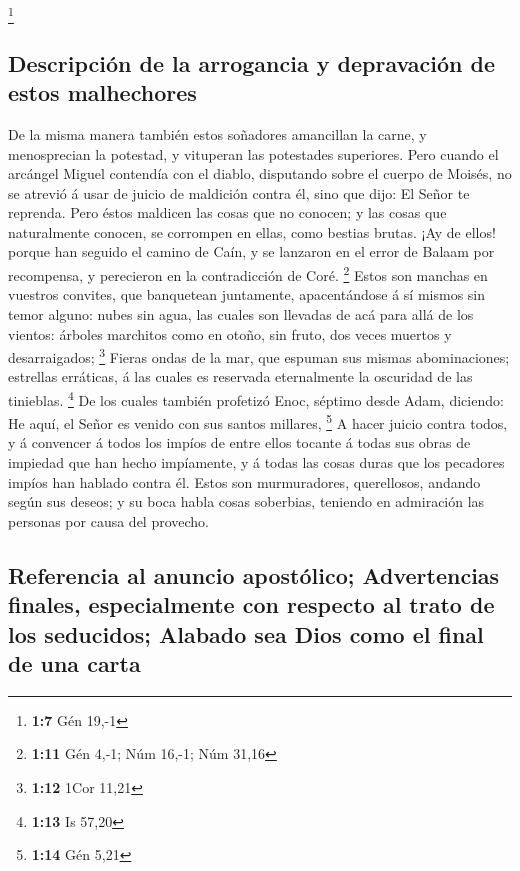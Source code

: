 \footnote{\textbf{1:7} Gén 19,-1}

\hypertarget{descripciuxf3n-de-la-arrogancia-y-depravaciuxf3n-de-estos-malhechores}{%
\subsection{Descripción de la arrogancia y depravación de estos
malhechores}\label{descripciuxf3n-de-la-arrogancia-y-depravaciuxf3n-de-estos-malhechores}}

 De la misma manera también estos soñadores amancillan la
carne, y menosprecian la potestad, y vituperan las potestades
superiores.  Pero cuando el arcángel Miguel contendía con
el diablo, disputando sobre el cuerpo de Moisés, no se atrevió á usar de
juicio de maldición contra él, sino que dijo: El Señor te reprenda.
 Pero éstos maldicen las cosas que no conocen; y las
cosas que naturalmente conocen, se corrompen en ellas, como bestias
brutas.  ¡Ay de ellos! porque han seguido el camino de
Caín, y se lanzaron en el error de Balaam por recompensa, y perecieron
en la contradicción de Coré. \footnote{\textbf{1:11} Gén 4,-1; Núm
  16,-1; Núm 31,16}  Estos son manchas en vuestros
convites, que banquetean juntamente, apacentándose á sí mismos sin temor
alguno: nubes sin agua, las cuales son llevadas de acá para allá de los
vientos: árboles marchitos como en otoño, sin fruto, dos veces muertos y
desarraigados; \footnote{\textbf{1:12} 1Cor 11,21} 
Fieras ondas de la mar, que espuman sus mismas abominaciones; estrellas
erráticas, á las cuales es reservada eternalmente la oscuridad de las
tinieblas. \footnote{\textbf{1:13} Is 57,20}  De los
cuales también profetizó Enoc, séptimo desde Adam, diciendo: He aquí, el
Señor es venido con sus santos millares, \footnote{\textbf{1:14} Gén
  5,21}  A hacer juicio contra todos, y á convencer á
todos los impíos de entre ellos tocante á todas sus obras de impiedad
que han hecho impíamente, y á todas las cosas duras que los pecadores
impíos han hablado contra él.  Estos son murmuradores,
querellosos, andando según sus deseos; y su boca habla cosas soberbias,
teniendo en admiración las personas por causa del provecho.

\hypertarget{referencia-al-anuncio-apostuxf3lico-advertencias-finales-especialmente-con-respecto-al-trato-de-los-seducidos-alabado-sea-dios-como-el-final-de-una-carta}{%
\subsection{Referencia al anuncio apostólico; Advertencias finales,
especialmente con respecto al trato de los seducidos; Alabado sea Dios
como el final de una
carta}\label{referencia-al-anuncio-apostuxf3lico-advertencias-finales-especialmente-con-respecto-al-trato-de-los-seducidos-alabado-sea-dios-como-el-final-de-una-carta}}

